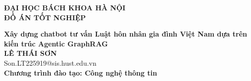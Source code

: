 \documentclass[DoAn.tex]{subfiles}
\begin{document}
\begin{titlepage}
\thispagestyle{empty}
\begin{center}

{\textbf{\large{ĐẠI HỌC BÁCH KHOA HÀ NỘI}}}\\[4cm]

{\textbf{\huge{ ĐỒ ÁN TỐT NGHIỆP}}}\\[1cm]
{\textbf{\Large{Xây dựng chatbot tư vấn Luật hôn nhân gia đình Việt Nam dựa trên kiến trúc Agentic GraphRAG}}\\[0.5cm]

{\textbf{\large{LÊ THÁI SƠN}}}\\
{\large{Son.LT225919@sis.hust.edu.vn}}\\[0.5cm]

{\textbf{\large{Chương trình đào tạo: Công nghệ thông tin
}}}\\

\vspace{4cm}
\begin{table}[H]
\centering
{}
\end{table}}
\end{center}



\end{titlepage}
\end{document}

